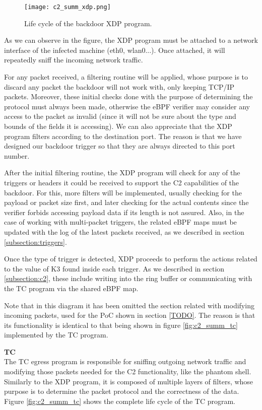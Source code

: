 \begin{figure}[htbp]
	\centering
	\texttt{[image: c2\_summ\_xdp.png]}
	\caption{Life cycle of the backdoor XDP program.}
	\label{fig:c2_summ_xdp}
\end{figure}

As we can observe in the figure, the XDP program must be attached to a network interface of the infected machine (eth0, wlan0...). Once attached, it will repeatedly sniff the incoming network traffic.

For any packet received, a filtering routine will be applied, whose purpose is to discard any packet the backdoor will not work with, only keeping TCP/IP packets. Moreover, these initial checks done with the purpose of determining the protocol must always been made, otherwise the eBPF verifier may consider any access to the packet as invalid (since it will not be sure about the type and bounds of the fields it is accessing). We can also appreciate that the XDP program filters according to the destination port. The reason is that we have designed our backdoor trigger so that they are always directed to this port number.

After the initial filtering routine, the XDP program will check for any of the triggers or headers it could be received to support the C2 capabilities of the backdoor. For this, more filters will be implemented, usually checking for the payload or packet size first, and later checking for the actual contents since the verifier forbids accessing payload data if its length is not assured. Also, in the case of working with multi-packet triggers, the related eBPF maps must be updated with the log of the latest packets received, as we described in section \ref{subsection:triggers}.

Once the type of trigger is detected, XDP proceeds to perform the actions related to the value of K3 found inside each trigger. As we described in section \ref{subsection:c2}, these include writing into the ring buffer or communicating with the TC program via the shared eBPF map.

Note that in this diagram it has been omitted the section related with modifying incoming packets, used for the PoC shown in section \ref{TODO}. The reason is that its functionality is identical to that being shown in figure \ref{fig:c2_summ_tc} implemented by the TC program.


\textbf{TC}\\
The TC egress program is responsible for sniffing outgoing network traffic and modifying those packets needed for the C2 functionality, like the phantom shell. Similarly to the XDP program, it is composed of multiple layers of filters, whose purpose is to determine the packet protocol and the correctness of the data. Figure \ref{fig:c2_summ_tc} shows the complete life cycle of the TC program.

